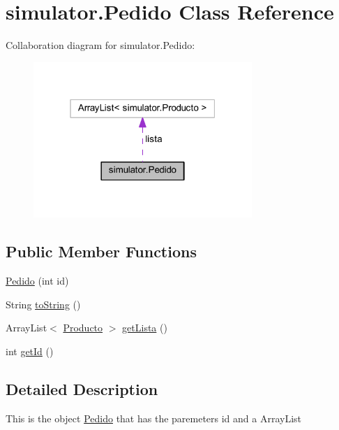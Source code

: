 \hypertarget{classsimulator_1_1_pedido}{}\section{simulator.\+Pedido Class Reference}
\label{classsimulator_1_1_pedido}


Collaboration diagram for simulator.\+Pedido\+:\nopagebreak
\begin{figure}[H]
\begin{center}
\leavevmode
\includegraphics[width=235pt]{classsimulator_1_1_pedido__coll__graph}
\end{center}
\end{figure}
\subsection*{Public Member Functions}
\begin{DoxyCompactItemize}
\item 
\mbox{\hyperlink{classsimulator_1_1_pedido_a2587e6c91c06bfd2057039ff2e10874a}{Pedido}} (int id)
\item 
String \mbox{\hyperlink{classsimulator_1_1_pedido_a5519f7e51ab5b3506840f332a7cd1157}{to\+String}} ()
\item 
Array\+List$<$ \mbox{\hyperlink{classsimulator_1_1_producto}{Producto}} $>$ \mbox{\hyperlink{classsimulator_1_1_pedido_ae5b5f146669e6f891fc8dc8e58ef8c64}{get\+Lista}} ()
\item 
int \mbox{\hyperlink{classsimulator_1_1_pedido_a22c3691133eaa7c5b467072e2e4c3ed9}{get\+Id}} ()
\end{DoxyCompactItemize}


\subsection{Detailed Description}
This is the object \mbox{\hyperlink{classsimulator_1_1_pedido}{Pedido}} that has the paremeters id and a Array\+List

